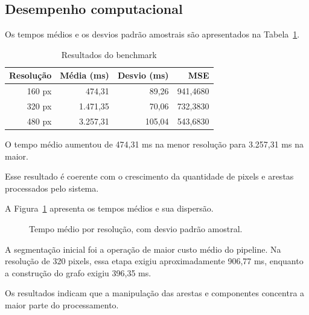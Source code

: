 \documentclass[12pt]{article}
\begin{document}
\subsection{Desempenho computacional}

Os tempos médios e os desvios padrão
amostrais são apresentados
na Tabela~\ref{tab:desempenho}.

\begin{table}[htbp]
\centering
\caption{Resultados do benchmark}
\label{tab:desempenho}
\small
\begin{tabular}{rrrr}
\toprule
Resolução & Média (ms) & Desvio (ms) & MSE \\
\midrule
160 px & 474,31 & 89,26 & 941,4680 \\
320 px & 1.471,35 & 70,06 & 732,3830 \\
480 px & 3.257,31 & 105,04 & 543,6830 \\
\bottomrule
\end{tabular}
\end{table}

O tempo médio aumentou de 474,31 ms na
menor resolução para 3.257,31 ms na maior.

Esse resultado é coerente com o crescimento
da quantidade de pixels e arestas
processados pelo sistema.

A Figura~\ref{fig:desempenho} apresenta
os tempos médios e sua dispersão.

\begin{figure}[htbp]
\centering
{}
\caption{Tempo médio por resolução, com desvio padrão amostral.}
\label{fig:desempenho}
\end{figure}

A segmentação inicial foi a operação
de maior custo médio do pipeline.
Na resolução de 320 pixels, essa etapa
exigiu aproximadamente 906,77 ms,
enquanto a construção do grafo
exigiu 396,35 ms.

Os resultados indicam que a manipulação
das arestas e componentes concentra
a maior parte do processamento.
\end{document}

